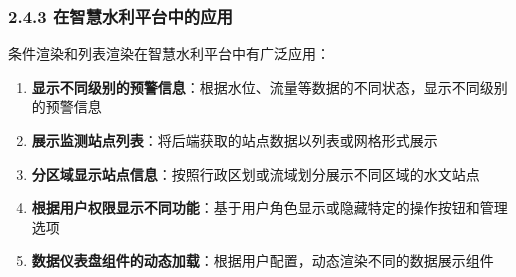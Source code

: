 \subsubsection{2.4.3
在智慧水利平台中的应用}\label{ux5728ux667aux6167ux6c34ux5229ux5e73ux53f0ux4e2dux7684ux5e94ux7528}

条件渲染和列表渲染在智慧水利平台中有广泛应用：

\begin{enumerate}
\def\labelenumi{\arabic{enumi}.}
\tightlist
\item
  \textbf{显示不同级别的预警信息}：根据水位、流量等数据的不同状态，显示不同级别的预警信息
\item
  \textbf{展示监测站点列表}：将后端获取的站点数据以列表或网格形式展示
\item
  \textbf{分区域显示站点信息}：按照行政区划或流域划分展示不同区域的水文站点
\item
  \textbf{根据用户权限显示不同功能}：基于用户角色显示或隐藏特定的操作按钮和管理选项
\item
  \textbf{数据仪表盘组件的动态加载}：根据用户配置，动态渲染不同的数据展示组件
\end{enumerate}
